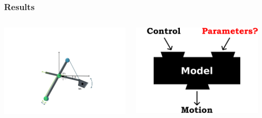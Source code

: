 \documentclass{beamer}
\begin{document}
\begin{frame}[c]
	\frametitle{Results}

	\begin{columns}
			\includegraphics[trim=30cm 5cm 30cm 23cm, clip=true, width=\linewidth]{img/Excavator_results}
		
			\includegraphics[width=\linewidth]{img/Model_4}
	\end{columns}
\end{frame}
\end{document}
